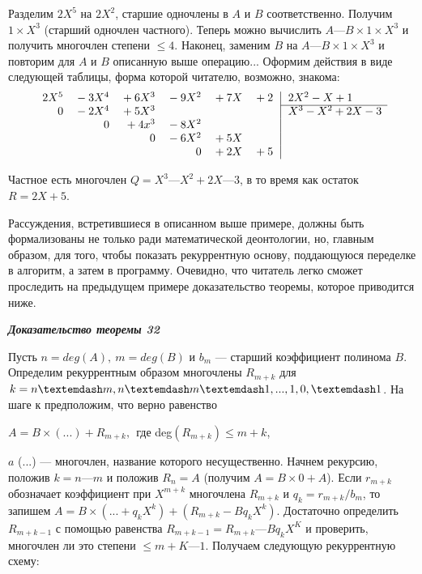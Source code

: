 \documentclass{mai_book}
\begin{document}
Разделим $2X^5$ на $2X^2$, старшие одночлены в $A$ и $B$ соответственно. 
Получим $1 \times X^3$ (старший одночлен частного). Теперь можно вычислить 
$A — B \times 1 \times X^3$ и получить многочлен степени $\leq 4$. Наконец, заменим $B$ 
на $A — B \times 1 \times X^3$ и повторим для $A$ и $B$ описанную выше операцию... 
Оформим действия в виде следующей таблицы, форма которой  
читателю, возможно, знакома: 
$$
\begin{array}{rrrrrr@{\,}r|l}
2X^5&{}-3X^4&{}+6X^3&{}-9X^2&{}+7X&{}+2&&\,2X^2-X+1\\
\cline{8-8}
0&{}-2X^4&{}+5X^3&&&&&\,X^3-X^2+2X-3\\
&{}0&{}+4x^3&{}-8X^2&&&&\\
&{}&{}0&{}-6X^2&{}+5X&{}&&\\
&{}&{}&{}0&{}+2X&{}+5&{}&\\
\end{array}
$$

Частное есть многочлен $Q = X^3 — X^2 + 2X — 3$, в то время как 
остаток $R = 2X + 5$. 

Рассуждения, встретившиеся в описанном выше примере, должны 
быть формализованы не только ради математической деонтологии, но, 
главным образом, для того, чтобы показать рекуррентную основу,  
поддающуюся переделке в алгоритм, а затем в программу. Очевидно, что 
читатель легко сможет проследить на предыдущем примере  
доказательство теоремы, которое приводится ниже. 

\noindent\textbf{\textit{Доказательство теоремы 32}}

Пусть $n = deg(A),\: m = deg(B)$ и $b_m$ — старший коэффициент  
полинома $B$. Определим рекуррентным образом многочлены $R_{m+k}$ для 
$k = n — m, n — m — 1,\newline ..., 1,0, —1$. На шаге к предположим, что верно 
равенство

\begin{center}
$A = B \times (...) + R_{m+k},\:\:$где deg$(R_{m+k}) \leq m + k$,
\end{center} 
\pagebreak

\noindent$a$ (...) — многочлен, название которого несущественно. Начнем  
рекурсию, положив $k = n — m$ и положив $R_n = A$ (получим $A = B \times 0 + A$). 
Если $r_{m+k}$ обозначает коэффициент при $X^{m+k}$ многочлена $R_{m+k}$ и 
$q_k = r_{m+k}\slash b_m$, то запишем $A = B\times (... + q_kX^k) + (R_{m+k} - Bq_kX^k)$.  
Достаточно определить $R_{m+k-1}$ с помощью равенства $R_{m+k-1} = R_{m+k} — 
Bq_kX^K$ и проверить, многочлен ли это степени $\leq m + K — 1$. Получаем 
следующую рекуррентную схему:
\end{document}
